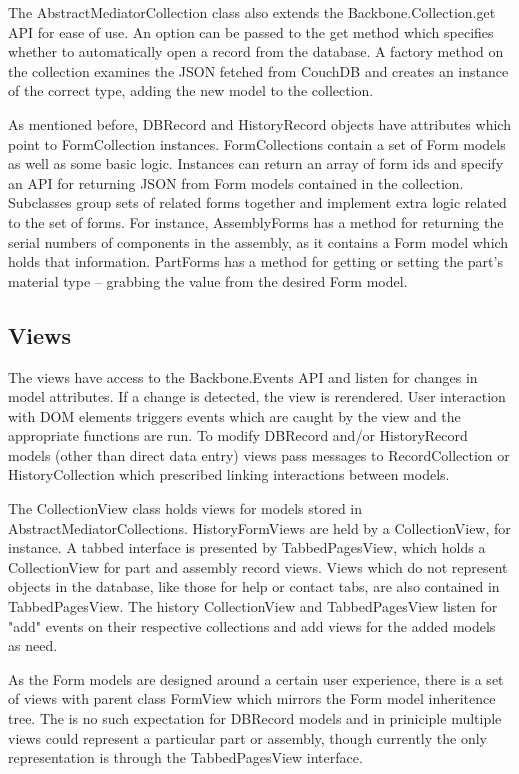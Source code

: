 \documentclass[journal]{IEEEtran}
\begin{document}
The AbstractMediatorCollection class also extends the
Backbone.Collection.get API for ease of use. An option can be passed to the get method which
specifies whether to automatically open a record from the database.
A factory method on the collection examines the JSON
fetched from CouchDB and creates an instance of the correct type, adding the new model
to the collection. 

As mentioned before, DBRecord and HistoryRecord objects have attributes which point to FormCollection instances.
FormCollections contain a set of Form models as well as some basic logic. Instances can return an array of form ids
and specify an API for returning JSON from Form models contained in the collection. Subclasses 
group sets of related forms together and implement extra logic related to the set of forms. For instance, AssemblyForms
has a method for returning the serial numbers of components in the assembly, as it contains a Form model which holds
that information. PartForms has a method for getting or setting the part's material type -- grabbing the value from the
desired Form model.

\subsection{Views}
The views have access to the Backbone.Events API and listen for changes in model attributes. If a change is detected,
the view is rerendered. User interaction with DOM elements triggers events which are caught by the view and the appropriate
functions are run. To modify DBRecord and/or HistoryRecord models (other than direct data entry) views pass messages to 
RecordCollection or HistoryCollection which prescribed linking interactions between models.

The CollectionView class holds views for models stored in AbstractMediatorCollections. HistoryFormViews
are held by a CollectionView, for instance. A tabbed interface is presented by TabbedPagesView,
which holds a CollectionView for part and assembly record views. Views which do not represent objects in the database, like those
for help or contact tabs, are also contained in TabbedPagesView. The history CollectionView and TabbedPagesView
listen for "add" events on their respective collections and add views for the added models as need.

As the Form models are designed around a certain user experience, there is a set of views with parent class
FormView which mirrors the Form model inheritence tree. The is no such expectation for DBRecord models and
in priniciple multiple views could represent a particular part or assembly, though currently the only representation is
through the TabbedPagesView interface.
\end{document}
